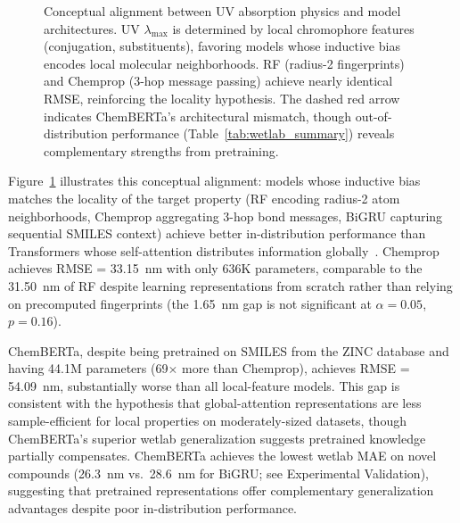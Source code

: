\documentclass[journal=jcisd8,manuscript=article]{achemso}
\begin{document}
\begin{figure}[htbp]
 \caption{Conceptual alignment between UV absorption physics and model architectures. UV $\lambda_{\max}$ is determined by local chromophore features (conjugation, substituents), favoring models whose inductive bias encodes local molecular neighborhoods. RF (radius-2 fingerprints) and Chemprop (3-hop message passing) achieve nearly identical RMSE, reinforcing the locality hypothesis. The dashed red arrow indicates ChemBERTa's architectural mismatch, though out-of-distribution performance (Table~\ref{tab:wetlab_summary}) reveals complementary strengths from pretraining.}
 \label{fig:local_vs_global}
\end{figure}

Figure~\ref{fig:local_vs_global} illustrates this conceptual alignment: models whose inductive bias matches the locality of the target property (RF encoding radius-2 atom neighborhoods, Chemprop aggregating 3-hop bond messages, BiGRU capturing sequential SMILES context) achieve better in-distribution performance than Transformers whose self-attention distributes information globally~\cite{chenMolecularLanguage2023, jiang2023trangru}.
Chemprop achieves RMSE = 33.15~nm with only 636K parameters, comparable to the 31.50~nm of RF despite learning representations from scratch rather than relying on precomputed fingerprints (the 1.65~nm gap is not significant at $\alpha = 0.05$, $p = 0.16$).

ChemBERTa, despite being pretrained on SMILES from the ZINC database and having 44.1M parameters (69$\times$ more than Chemprop), achieves RMSE = 54.09~nm, substantially worse than all local-feature models.
This gap is consistent with the hypothesis that global-attention representations are less sample-efficient for local properties on moderately-sized datasets, though ChemBERTa's superior wetlab generalization suggests pretrained knowledge partially compensates.
ChemBERTa achieves the lowest wetlab MAE on novel compounds (26.3~nm vs.\ 28.6~nm for BiGRU; see Experimental Validation), suggesting that pretrained representations offer complementary generalization advantages despite poor in-distribution performance.
\end{document}
